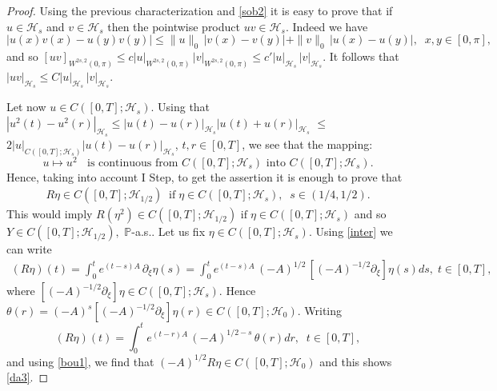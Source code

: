 \documentclass[preprint]{imsart}
\def\P{\mathbb P}
\begin{document}
\begin{proof}
 Using the previous characterization and \eqref{sob2} it is easy to prove that if  $u \in {\mathcal H}_s$ and $v \in {\mathcal H}_s$ then the pointwise product $u v \in {\mathcal H}_s $. Indeed we have 
  $$
   |u(x) v (x) - u(y) v (y)| \le \| u\|_{0} \, |v(x) - v(y)|
   +  \| v\|_{0} \, |u(x) - u(y)|, \;\; x,y \in [0, \pi],
 $$
 and so  $[u v]_{W^{2s,2}(0, \pi)} \le c |u|_{W^{2s,2}(0, \pi)}
  \, |v|_{W^{2s,2}(0, \pi)}
  \le c' |u|_{{\mathcal H}_s}\, |v|_{{\mathcal H}_s}$. It follows that 
   $|uv|_{{\mathcal H}_s} \le C |u|_{{\mathcal H}_s}\, |v|_{{\mathcal H}_s}$. 
   
 Let now $u  \in C([0,T]; {\mathcal H}_{s})$.  Using that $|u^{2}(t) - u^2(r)|_{{\mathcal H}_s} \le |u(t) - u(r)|_{{\mathcal H}_s} 
  |u^{}(t) + u(r)|_{{\mathcal H}_s} $ $\le  $ $2 |u|_{C([0,T]; {\mathcal H}_{s})} |u(t) - u(r)|_{{\mathcal H}_s}$, $t, r \in [0,T]$, we see that 
    the mapping: 
\begin{equation}
   u \mapsto u^2 \;\; \text{  is continuous from $C([0,T]; {\mathcal H}_{s})$ into $C([0,T]; {\mathcal H}_{s})$}.
\end{equation}
 Hence, 
taking into account I Step, to get the assertion it is enough to prove that 
\begin{gather} \label{da3}
R \eta \in C([0,T]; {\mathcal H}_{1/2}) \;\; \text{if} \; \eta \in C([0,T]; {\mathcal H}_{s}) , \;\; s \in (1/4, 1/2).
\end{gather}
This would imply   $R (\eta^2)  \in C([0,T]; {\mathcal H}_{1/2}) $  $\text{if} \; \eta \in C([0,T]; {\mathcal H}_{s})$ and so  $Y \in C([0,T]; {\mathcal H}_{1/2}),  $ $\P$-a.s..  
   Let us fix $\eta \in C([0,T]; {\mathcal H}_{s}).$
 Using \eqref{inter} we can write 
\begin{gather*}
(R\eta)(t) = \int_{0}^{t} e^{(  t-s)  A} \, \partial_{\xi}  
\eta (s) = \int_{0}^{t} e^{(  t-s)  A} \, (-A)^{1/2}  \, [(-A)^{-1/2} \partial_{\xi}]  
\eta (s) 
ds, \; t \in [0,T], 
\end{gather*}
 where $ [(-A)^{-1/2} \partial_{\xi}]  
\eta   \in C([0,T]; {\mathcal H}_s)$. Hence $
\theta(r)=  (-A)^s [(-A)^{-1/2} \partial_{\xi}]  
\eta(r) \in C([0,T]; {\mathcal H}_0)$. Writing
$$
(R\eta)(t) = \int_{0}^{t} e^{(  t-r)  A} \, (-A)^{1/2 -s}  \, \theta (r) dr, \;\; t \in [0,T],
$$
 and using 
 \eqref{bou1}, we find that $(-A)^{1/2} R \eta \in C([0,T]; {\mathcal H}_0)$
and this shows \eqref{da3}.
 

\end{proof}
\end{document}
